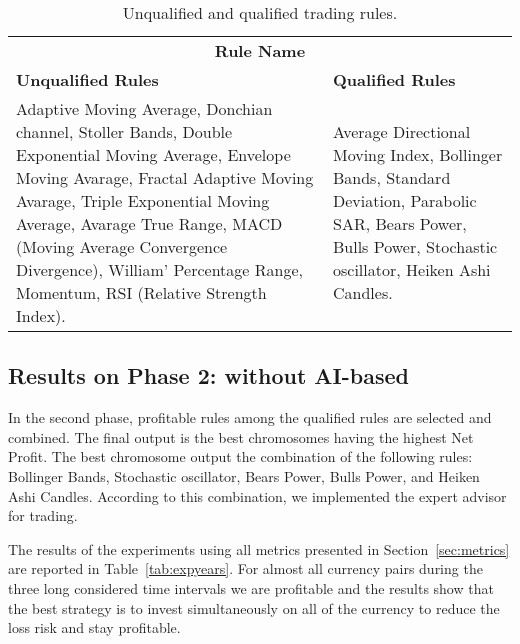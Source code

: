 \begin{table}[h!]
  \begin{center} 
    \caption{Unqualified and qualified trading rules.}
    \label{tab:qualrules}
    \begin{tabular}{p{6cm}  p{6cm} }
    \hline
    \multicolumn{2}{c}{\textbf{Rule Name}}
    \\\cline{1-2}
    \textbf{Unqualified Rules} & \textbf{Qualified Rules}\\
    \hline
    Adaptive Moving Average, Donchian channel, Stoller Bands,  Double Exponential Moving Average, Envelope Moving Avarage,  Fractal Adaptive Moving Avarage, Triple Exponential Moving Average, Avarage True Range,  MACD (Moving Average Convergence Divergence),  William' Percentage Range, Momentum, RSI (Relative Strength Index). 
    &
    Average Directional Moving Index, Bollinger Bands, Standard Deviation, Parabolic SAR, Bears Power, Bulls Power, Stochastic oscillator, Heiken Ashi Candles.\\
      \hline
    \end{tabular}
  \end{center}
\end{table}

\subsection{Results on Phase 2: without AI-based}
In the second phase, profitable rules among the qualified rules are selected and combined. The final output is the best chromosomes having the highest Net Profit.
The best chromosome output the combination of the following rules: Bollinger Bands, Stochastic oscillator, Bears Power, Bulls Power, and Heiken Ashi Candles. According to this combination, we implemented the expert advisor for trading. 

The results of the experiments using all metrics presented in Section~\ref{sec:metrics} are reported in Table~\ref{tab:expyears}. For almost all currency pairs during the three long considered time intervals we are profitable and the results show that the best strategy is to invest simultaneously on all of the currency to reduce the loss risk and stay profitable. %

